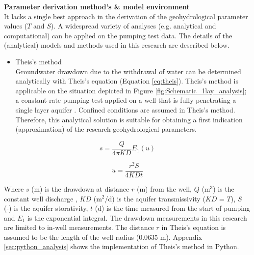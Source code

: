 \textbf{Parameter derivation method's \& model environment} \\
It lacks a single best approach in the derivation of the geohydrological parameter values ($T$ and $S$). A widespread variety of analyses (e.g. analytical and computational) can be applied on the pumping test data. The details of the (analytical) models and methods used in this research are described below.

\begin{itemize}
\item{Theis's method} \\
Groundwater drawdown due to the withdrawal of water can be determined analytically with Theis's equation (Equation \ref{eq:theis}). Theis's method is applicable on the situation depicted in Figure  \ref{fig:Schematic_1lay_analysis}; a constant rate pumping test applied on a well that is fully penetrating a single layer aquifer \citep{Kruseman2000}. Confined conditions are assumed in Theis's method. Therefore, this analytical solution is suitable for obtaining a first indication (approximation) of the research geohydrological parameters.   
\end{itemize}


\begin{equation}
\label{eq:theis}
 s = \frac{Q}{4\pi K D} E_1(u)
\end{equation}

\begin{equation}
 u = \frac{r^{2} S}{4 K D t}
\end{equation}

Where $s$ (m) is the drawdown at distance $r$ (m) from the well, $Q$ (m$^{3}$) is the constant well discharge , $KD$ (m$^{2}$/d) is the aquifer transmissivity ($KD$ = $T$), $S$ (-) is the aquifer storativity, $t$ (d) is the time measured from the start of pumping and $E_1$ is the exponential integral. The drawdown measurements in this research are limited to in-well measurements. The distance $r$ in Theis's equation is assumed to be the length of the well radius (0.0635 m). Appendix \ref{sec:python_analysis} shows the implementation of Theis's method in Python.

